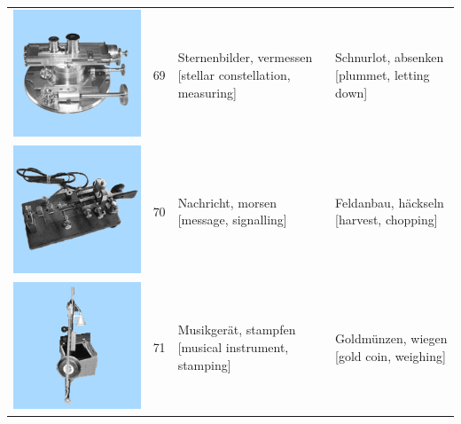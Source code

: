 \documentclass[
  english,
  doc,12pt,twoside,floatsintext]{apa7}
\begin{document}
\begin{center}
\begin{ThreePartTable}
{\begin{longtable}{llll}
\includegraphics[valign=c, scale=0.23]{../materials/unfamiliar/69.png} & 69 & \makecell[l]{Sternenbilder, vermessen\\{[stellar constellation, measuring]}} & \makecell[l]{Schnurlot, absenken\\{[plummet, letting down]}}\\
\includegraphics[valign=c, scale=0.23]{../materials/unfamiliar/70.png} & 70 & \makecell[l]{Nachricht, morsen\\{[message, signalling]}} & \makecell[l]{Feldanbau, häckseln\\{[harvest, chopping]}}\\
\includegraphics[valign=c, scale=0.23]{../materials/unfamiliar/71.png} & 71 & \makecell[l]{Musikgerät, stampfen\\{[musical instrument, stamping]}} & \makecell[l]{Goldmünzen, wiegen\\{[gold coin, weighing]}}\\

\end{longtable}}
\end{ThreePartTable}
\end{center}
\end{document}
